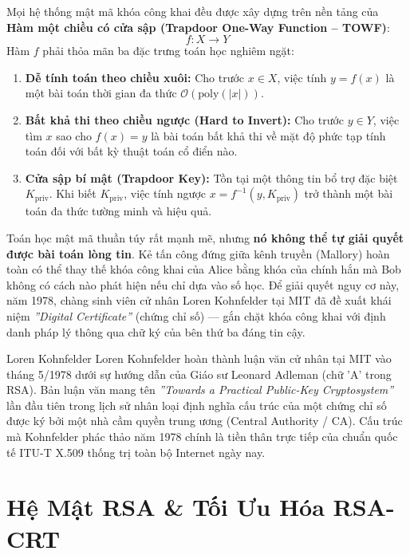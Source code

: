 Mọi hệ thống mật mã khóa công khai đều được xây dựng trên nền tảng của \textbf{Hàm một chiều có cửa sập (Trapdoor One-Way Function -- TOWF)}:
\begin{equation}
f: X \to Y
\end{equation}
Hàm $f$ phải thỏa mãn ba đặc trưng toán học nghiêm ngặt:
\begin{enumerate}
  \item \textbf{Dễ tính toán theo chiều xuôi:} Cho trước $x \in X$, việc tính $y = f(x)$ là một bài toán thời gian đa thức $\mathcal{O}(\text{poly}(|x|))$.
  \item \textbf{Bất khả thi theo chiều ngược (Hard to Invert):} Cho trước $y \in Y$, việc tìm $x$ sao cho $f(x) = y$ là bài toán bất khả thi về mặt độ phức tạp tính toán đối với bất kỳ thuật toán cổ điển nào.
  \item \textbf{Cửa sập bí mật (Trapdoor Key):} Tồn tại một thông tin bổ trợ đặc biệt $K_{\text{priv}}$. Khi biết $K_{\text{priv}}$, việc tính ngược $x = f^{-1}(y, K_{\text{priv}})$ trở thành một bài toán đa thức tường minh và hiệu quả.
\end{enumerate}

\begin{batngo}
Toán học mật mã thuần túy rất mạnh mẽ, nhưng \textbf{nó không thể tự giải quyết được bài toán lòng tin}. Kẻ tấn công đứng giữa kênh truyền (Mallory) hoàn toàn có thể thay thế khóa công khai của Alice bằng khóa của chính hắn mà Bob không có cách nào phát hiện nếu chỉ dựa vào số học. Để giải quyết nguy cơ này, năm 1978, chàng sinh viên cử nhân Loren Kohnfelder tại MIT đã đề xuất khái niệm \emph{''Digital Certificate''} (chứng chỉ số) --- gắn chặt khóa công khai với định danh pháp lý thông qua chữ ký của bên thứ ba đáng tin cậy.
\end{batngo}

\begin{chandung}{Loren Kohnfelder}
Loren Kohnfelder hoàn thành luận văn cử nhân tại MIT vào tháng 5/1978 dưới sự hướng dẫn của Giáo sư Leonard Adleman (chữ 'A' trong RSA). Bản luận văn mang tên \emph{''Towards a Practical Public-Key Cryptosystem''} lần đầu tiên trong lịch sử nhân loại định nghĩa cấu trúc của một chứng chỉ số được ký bởi một nhà cầm quyền trung ương (Central Authority / CA). Cấu trúc mà Kohnfelder phác thảo năm 1978 chính là tiền thân trực tiếp của chuẩn quốc tế ITU-T X.509 thống trị toàn bộ Internet ngày nay.
\end{chandung}

\section{Hệ Mật RSA \& Tối Ưu Hóa RSA-CRT}

